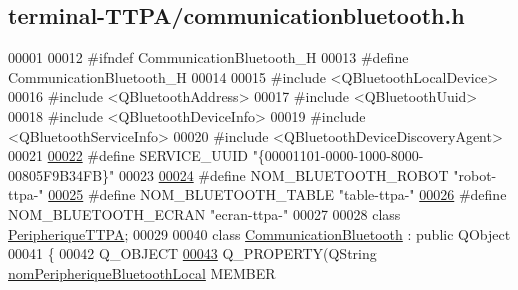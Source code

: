 \hypertarget{terminal-_t_t_p_a_2communicationbluetooth_8h_source}{}\subsection{terminal-\/\+T\+T\+P\+A/communicationbluetooth.h}
\label{terminal-_t_t_p_a_2communicationbluetooth_8h_source}

\begin{DoxyCode}
00001 
00012 \textcolor{preprocessor}{#ifndef CommunicationBluetooth\_H}
00013 \textcolor{preprocessor}{#define CommunicationBluetooth\_H}
00014 
00015 \textcolor{preprocessor}{#include <QBluetoothLocalDevice>}
00016 \textcolor{preprocessor}{#include <QBluetoothAddress>}
00017 \textcolor{preprocessor}{#include <QBluetoothUuid>}
00018 \textcolor{preprocessor}{#include <QBluetoothDeviceInfo>}
00019 \textcolor{preprocessor}{#include <QBluetoothServiceInfo>}
00020 \textcolor{preprocessor}{#include <QBluetoothDeviceDiscoveryAgent>}
00021 
\hyperlink{terminal-_t_t_p_a_2communicationbluetooth_8h_a445125ee8c34695376c85f10b38844d6}{00022} \textcolor{preprocessor}{#define SERVICE\_UUID      "\{00001101-0000-1000-8000-00805F9B34FB\}"}
00023 
\hyperlink{terminal-_t_t_p_a_2communicationbluetooth_8h_a47332bb9b30ed8b0f38fa7b5bd11fd47}{00024} \textcolor{preprocessor}{#define NOM\_BLUETOOTH\_ROBOT "robot-ttpa-"}
\hyperlink{terminal-_t_t_p_a_2communicationbluetooth_8h_aa416b2be7573de0d7832248a27ba09a8}{00025} \textcolor{preprocessor}{#define NOM\_BLUETOOTH\_TABLE "table-ttpa-"}
\hyperlink{terminal-_t_t_p_a_2communicationbluetooth_8h_a2bd8beaaf0c4b59979a3f78d4c134ec8}{00026} \textcolor{preprocessor}{#define NOM\_BLUETOOTH\_ECRAN "ecran-ttpa-"}
00027 
00028 \textcolor{keyword}{class }\hyperlink{class_peripherique_t_t_p_a}{PeripheriqueTTPA};
00029 
00040 \textcolor{keyword}{class }\hyperlink{class_communication_bluetooth}{CommunicationBluetooth} : \textcolor{keyword}{public} QObject
00041 \{
00042     Q\_OBJECT
\hyperlink{class_communication_bluetooth_a6781eed73c4b5db0fe7ff94c034f2cf5}{00043}     Q\_PROPERTY(QString \hyperlink{class_communication_bluetooth_a6781eed73c4b5db0fe7ff94c034f2cf5}{nomPeripheriqueBluetoothLocal} MEMBER 

\end{DoxyCode}
